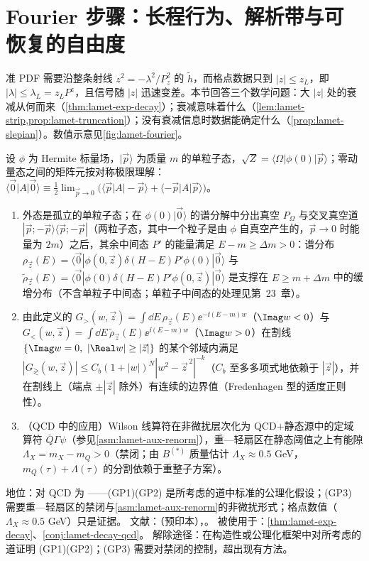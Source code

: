 \section{Fourier 步骤：长程行为、解析带与可恢复的自由度}\label{sec:lamet-fourier}

准 PDF 需要沿整条射线 $z^2=-\lambda^2/P_z^2$ 的 $\tilde h$，而格点数据只到 $|z|\le z_L$，即 $|\lambda|\le\lambda_L=z_LP^z$，且信号随 $|z|$ 迅速变差。本节回答三个数学问题：大 $|z|$ 处的衰减从何而来（\cref{thm:lamet-exp-decay}）；衰减意味着什么（\cref{lem:lamet-strip,prop:lamet-truncation}）；没有衰减信息时数据能确定什么（\cref{prop:lamet-slepian}）。数值示意见\cref{fig:lamet-fourier}。

\begin{assumption}\label{asm:lamet-gap}
设 $\phi$ 为 Hermite 标量场，$|\vec p\rangle$ 为质量 $m$ 的单粒子态，$\sqrt Z=\langle\Omega|\phi(0)|\vec p\rangle$；零动量态之间的矩阵元按对称极限理解：$\langle\vec 0|A|\vec 0\rangle\equiv\frac12\lim_{\vec p\to0}\big(\langle\vec p|A|-\vec p\rangle+\langle-\vec p|A|\vec p\rangle\big)$\cite[第~5.1~节]{Ji:2026vir}。
\begin{enumerate}[label=(GP\arabic*),leftmargin=3.2em,itemsep=1pt,topsep=2pt]
\item 外态是孤立的单粒子态；在 $\phi(0)|\vec 0\rangle$ 的谱分解中分出真空 $P_\Omega$ 与交叉真空道 $|\vec p;-\vec p\rangle\langle\vec p;-\vec p|$（两粒子态，其中一个粒子是由 $\phi$ 自真空产生的，$\vec p\to0$ 时能量为 $2m$）之后，其余中间态 $P'$ 的能量满足 $E-m\ge\Delta m>0$：谱分布 $\rho_{\vec z}(E)=\langle\vec 0|\phi(0,\vec z)\delta(H-E)P'\phi(0)|\vec 0\rangle$ 与 $\tilde\rho_{\vec z}(E)=\langle\vec 0|\phi(0)\delta(H-E)P'\phi(0,\vec z)|\vec 0\rangle$ 是支撑在 $E\ge m+\Delta m$ 中的缓增分布（不含单粒子中间态；单粒子中间态的处理见第~23~章）。
\item 由此定义的 $G_>(w,\vec z)=\int\dd E\,\rho_{\vec z}(E)\ee^{-\ii(E-m)w}$（$\Imag w<0$）与 $G_<(w,\vec z)=\int\dd E\,\tilde\rho_{\vec z}(E)\ee^{\ii(E-m)w}$（$\Imag w>0$）在割线 $\{\Imag w=0,\ |\Real w|\ge|\vec z|\}$ 的某个邻域内满足 $|G_\gtrless(w,\vec z)|\le C_b(1+|w|)^N|w^2-\vec z^{\,2}|^{-k}$（$C_b$ 至多多项式地依赖于 $|\vec z|$），并在割线上（端点 $\pm|\vec z|$ 除外）有连续的边界值（Fredenhagen 型的适度正则性）。
\item （QCD 中的应用）Wilson 线算符在非微扰层次化为 QCD$+$静态源中的定域算符 $\bar Q\Gamma\psi$（参见\cref{asm:lamet-aux-renorm}），重—轻扇区在静态阈值之上有能隙 $\Lambda_X=m_X-m_Q>0$（禁闭；由 $B^{(*)}$ 质量估计 $\Lambda_X\approx0.5$ GeV，$m_Q(\tau)+\Lambda(\tau)$ 的分割依赖于重整子方案）。
\end{enumerate}
地位：对 QCD 为 \tagC——(GP1)(GP2) 是所考虑的道中标准的公理化假设；(GP3) 需要重—轻扇区的禁闭与\cref{asm:lamet-aux-renorm}的非微扰形式；格点数值（$\Lambda_X\approx0.5$ GeV）只是证据。
文献：\cite[第~5~节]{Ji:2026vir}（预印本），\cite{Fredenhagen:1984bz}。
被使用于：\cref{thm:lamet-exp-decay}、\cref{conj:lamet-decay-qcd}。
解除途径：在构造性或公理化框架中对所考虑的道证明 (GP1)(GP2)；(GP3) 需要对禁闭的控制，超出现有方法。
\end{assumption}

